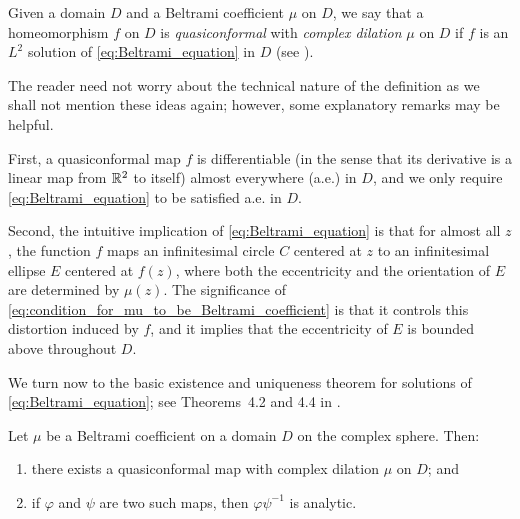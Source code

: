 \begin{definition}
    Given a domain $D$ and a Beltrami coefficient $\mu$ on $D$, we say that a
    homeomorphism $f$ on $D$ is \emph{quasiconformal} with \emph{complex
    dilation} $\mu$ on $D$ if $f$ is an $L^2$ solution of
    \eqref{eq:Beltrami_equation} in $D$ (see \cite[24]{Lehto1987}).
\end{definition}

The reader need not worry about the technical nature of the definition as we
shall not mention these ideas again; however, some explanatory remarks may be
helpful.

\begin{remark}
    First, a quasiconformal map $f$ is differentiable (in the sense that its
    derivative is a linear map from $\mathbb{R}^2$ to itself) almost everywhere (a.e.)
    in $D$, and we only require \eqref{eq:Beltrami_equation} to be satisfied
    a.e. in $D$.
\end{remark}

\begin{remark}
    Second, the intuitive implication of \eqref{eq:Beltrami_equation} is that
    for almost all $z$, the function $f$ maps an infinitesimal circle $C$
    centered at $z$ to an infinitesimal ellipse $E$ centered at $f(z)$, where
    both the eccentricity and the orientation of $E$ are determined by $\mu(z)$.
    The significance of \eqref{eq:condition_for_mu_to_be_Beltrami_coefficient}
    is that it controls this distortion induced by $f$, and it implies that the
    eccentricity of $E$ is bounded above throughout $D$.
\end{remark}

We turn now to the basic existence and uniqueness theorem for solutions of
\eqref{eq:Beltrami_equation}; see Theorems~4.2 and 4.4 in \cite{Lehto1987}.

\begin{theorem}
    \label{thm:existence_of_quasiconformal_maps_with_a_given_complex_dilation}
    Let $\mu$ be a Beltrami coefficient on a domain $D$ on the complex sphere.
    Then:
    \begin{enumerate}[label=(\roman*)]
        \item
        \label{itm:existence_of_quasiconformal_maps_with_a_given_complex_dilation}
        there exists a quasiconformal map with complex dilation $\mu$ on $D$;
        and
        \item \label{itm:transition_between_coordinate_charts_in_analytic} if
        $\varphi$ and $\psi$ are two such maps, then $\varphi\psi^{-1}$ is
        analytic.
    \end{enumerate}
\end{theorem}

